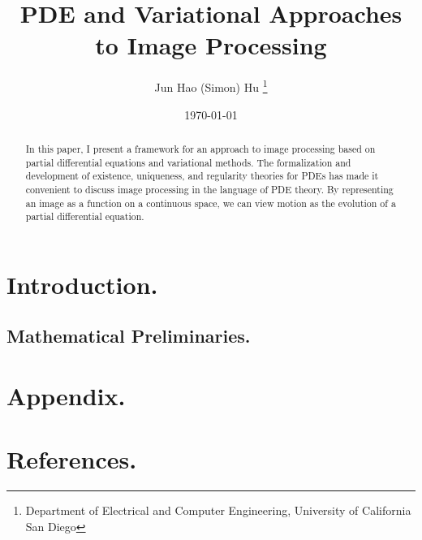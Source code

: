 \documentclass[10pt]{article}
\title{\Large{PDE and Variational Approaches to Image Processing}}
\author{Jun Hao (Simon) Hu \footnote{Department of Electrical and Computer Engineering, University of California San Diego}}
\date{\today}
\begin{document}
\maketitle

\begin{abstract}
	In this paper, I present a framework for an approach to image processing based on partial differential equations and variational methods. The formalization and development of existence, uniqueness, and regularity theories for PDEs has made it convenient to discuss image processing in the language of PDE theory. By representing an image as a function on a continuous space, we can view motion as the evolution of a partial differential equation. 
\end{abstract}
\newpage 
\tableofcontents

\newpage

\section{Introduction.}

\subsection{Mathematical Preliminaries.}

\section{Appendix.}

\section{References.}
\end{document}
